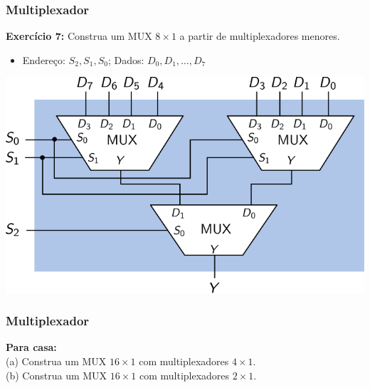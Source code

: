 \documentclass{beamer}
\begin{document}
\begin{frame}
\frametitle{Multiplexador}

\textbf{Exercício 7:} Construa um MUX $8\times1$ a partir de multiplexadores menores.
\begin{itemize}
\item Endereço: $S_2, S_1, S_0$; \hspace{2ex} Dados: $D_0, D_1, \ldots, D_7$
\end{itemize}

\pause

\begin{center}
\includegraphics{images/mux8x1_composite}
\end{center}

\end{frame}

\begin{frame}
\frametitle{Multiplexador}

\textbf{Para casa:}\\
(a) Construa um MUX $16\times1$ com multiplexadores $4\times1$.\\
(b) Construa um MUX $16\times1$ com multiplexadores $2\times1$.

\end{frame}
\end{document}
